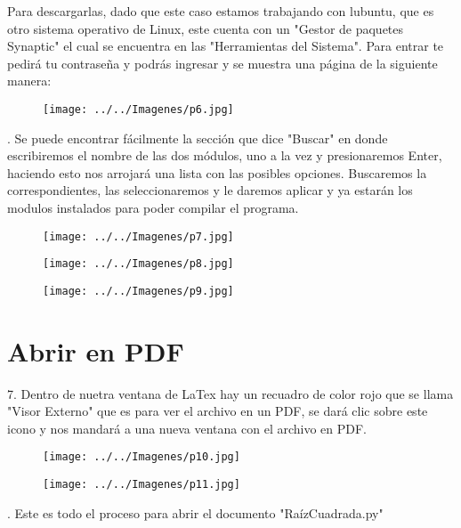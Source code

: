 \documentclass[letter,12pt]{article}
\begin{document}
Para descargarlas, dado que este caso estamos trabajando con lubuntu, que es otro sistema operativo de Linux, este cuenta con un "Gestor de paquetes Synaptic" el cual se encuentra en las "Herramientas del Sistema".
Para entrar te pedirá tu contraseña y podrás ingresar y se muestra una página de la siguiente manera:

\begin{figure}[h]
	\centering
	\texttt{[image: ../../Imagenes/p6.jpg]}
	\caption{}
	\label{fig:p6}
\end{figure}
. Se puede encontrar fácilmente la sección que dice "Buscar" en donde escribiremos el nombre de las dos módulos, uno a la vez y presionaremos Enter, haciendo esto nos arrojará una lista con las posibles opciones.
Buscaremos la correspondientes, las seleccionaremos y le daremos aplicar y ya estarán los modulos instalados para poder compilar el programa.

\begin{figure}[h]
	\centering
	\texttt{[image: ../../Imagenes/p7.jpg]}
	\caption{}
	\label{fig:p7}
\end{figure}

\begin{figure}[h]
	\centering
	\texttt{[image: ../../Imagenes/p8.jpg]}
	\caption{}
	\label{fig:p8}
\end{figure}
\newpage
\begin{figure}[h]
	\centering
	\texttt{[image: ../../Imagenes/p9.jpg]}
	\caption{}
	\label{fig:p9}
\end{figure}
\newpage
\section*{Abrir en PDF}
7. Dentro de nuetra ventana de LaTex hay un recuadro de color rojo que se llama "Visor Externo" que es para ver el archivo en un PDF, se dará clic sobre este icono y nos mandará a una nueva ventana con el archivo en PDF.

\begin{figure}[h]
	\centering
	\texttt{[image: ../../Imagenes/p10.jpg]}
	\caption{}
	\label{fig:p10}
\end{figure}

\begin{figure}[h]
	\centering
	\texttt{[image: ../../Imagenes/p11.jpg]}
	\caption{}
	\label{fig:p11}
\end{figure}
. Este es todo el proceso para abrir el documento "RaízCuadrada.py"
\end{document}
